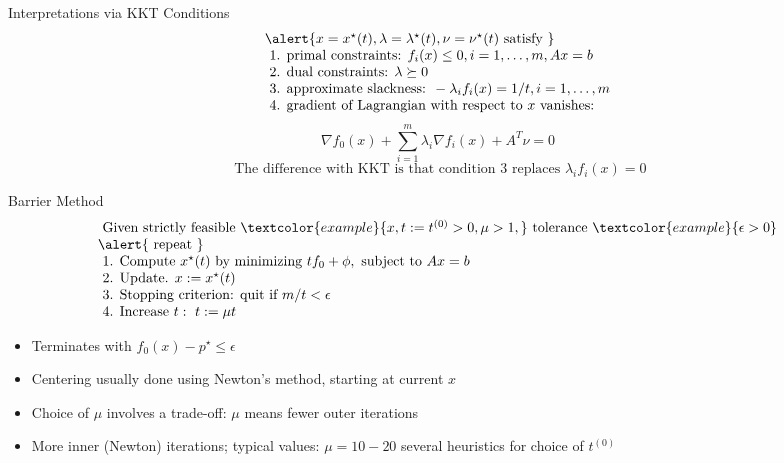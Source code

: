 \documentclass{beamer}
\begin{document}
\begin{frame}[noframenumbering]{Interpretations via KKT Conditions}
\begin{equation*}
\begin{array}{l} \alert{x=x^{\star}(t), \lambda=\lambda^{\star}(t), \nu=\nu^{\star}(t) \text { satisfy }} \\ {\text { 1. primal constraints: } f_{i}(x) \leq 0, i=1, \ldots, m, A x=b} \\ {\text { 2. dual constraints: } \lambda \succeq 0} \\ {\text { 3. approximate slackness: }
-\lambda_{i} f_{i}(x)=1 / t, i=1, \ldots, m} \\ {\text { 4. gradient of Lagrangian with respect to } x \text { vanishes: }}\end{array}
\end{equation*}
\begin{equation*}
\nabla f_{0}(x)+\sum_{i=1}^{m} \lambda_{i} \nabla f_{i}(x)+A^{T} \nu=0
\end{equation*}
\begin{equation*}
\text { The difference with } \mathrm{KKT} \text { is that condition } 3 \text { replaces } \lambda_{i} f_{i}(x)=0
\end{equation*}
\end{frame}


\begin{frame}[noframenumbering]{Barrier Method}
\begin{equation*}
\begin{array}{l}{\text { Given strictly feasible } \textcolor{example}{x, t:=t^{(0)}>0, \mu>1,} \text { tolerance } \textcolor{example}{\epsilon>0}} \\ \alert{\text { repeat }} \\ {\text { 1. Compute } x^{\star}(t) \text { by minimizing } t f_{0}+\phi, \text { subject to } A x=b} \\ {\text { 2. Update. } x:=x^{\star}(t)} \\ {\text { 3. Stopping criterion: quit if } m / t<\epsilon} \\ {\text { 4. Increase } t:\  t:=\mu t}\end{array}
\end{equation*}

\begin{itemize}
\item Terminates with $ f_{0}(x)-p^{\star} \leq \epsilon$
\item Centering usually done using Newton's method, starting at current $x$
\item Choice of $\mu$  involves a trade-off: $ \mu$ means fewer outer iterations
\item  More inner (Newton) iterations; typical values:  $\mu=10-20$ several heuristics for choice of $ t^{(0)}$
\end{itemize}
\end{frame}
\end{document}
